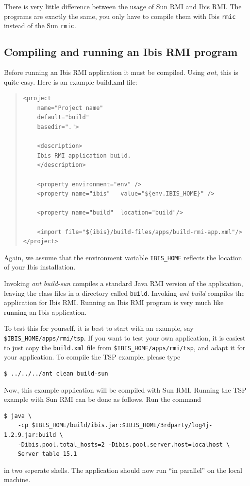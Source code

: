 \documentclass[10pt]{article}
\newcommand{\mysubsection}[1]{\subsection{#1}\label{#1}}
\newcommand{\remark}[1]{[\emph{#1}]}
\begin{document}
There is very little difference between the usage of Sun RMI and Ibis
RMI. The programs are exactly the same, you only have to compile them
with Ibis \texttt{rmic} instead of the Sun \texttt{rmic}. 



\mysubsection{Compiling and running an Ibis RMI program}

Before running an Ibis RMI application it must be compiled.
Using \emph{ant}, this is quite easy. Here is an example build.xml file:

\begin{quote}
\begin{verbatim}
<project
    name="Project name"
    default="build"
    basedir=".">

    <description>
    Ibis RMI application build.
    </description>

    <property environment="env" />
    <property name="ibis"   value="${env.IBIS_HOME}" />

    <property name="build"  location="build"/>

    <import file="${ibis}/build-files/apps/build-rmi-app.xml"/>
</project>
\end{verbatim}
\end{quote}

Again, we assume that the environment variable \texttt{IBIS\_HOME} reflects
the location of your Ibis installation.

Invoking \emph{ant build-sun} compiles a standard Java RMI version of
the application, leaving the class files in a directory called \texttt{build}.
Invoking \emph{ant build} compiles the application for Ibis RMI.
Running an Ibis RMI program is very much like running an Ibis application.

To test this for yourself, it is best to start with
an example, say \texttt{\$IBIS\_HOME/apps/rmi/tsp}. 
If you want to test your own application, it is easiest to just copy
the \texttt{build.xml} file from \texttt{\$IBIS\_HOME/apps/rmi/tsp}, and adapt it for your
application. 
To compile the TSP example, please type
\begin{verbatim}
$ ../../../ant clean build-sun
\end{verbatim}
\noindent
Now, this example application will be compiled with Sun RMI.
Running the TSP example with Sun RMI can be done as follows. Run the command
\begin{verbatim}
$ java \
    -cp $IBIS_HOME/build/ibis.jar:$IBIS_HOME/3rdparty/log4j-1.2.9.jar:build \
    -Dibis.pool.total_hosts=2 -Dibis.pool.server.host=localhost \
    Server table_15.1
\end{verbatim}
\noindent
in two seperate shells. The application should now run ``in parallel''
on the local machine.  
\end{document}
